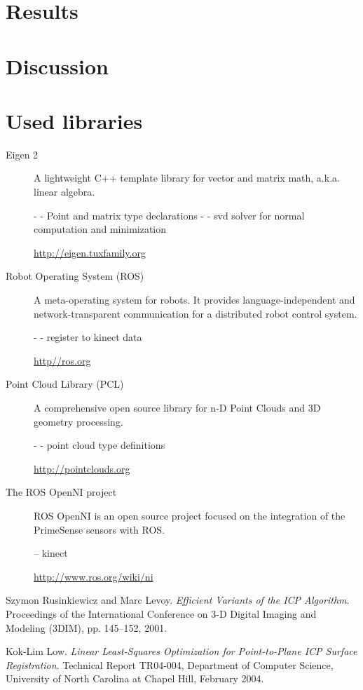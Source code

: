 \documentclass[twocolumn]{article}
\begin{document}
\section{Results}

\section{Discussion}

\section{Used libraries}
\begin{description}
\item[Eigen 2]
A lightweight C++ template library for vector and matrix math,
a.k.a. linear algebra.

- - Point and matrix type declarations
- - svd solver for normal computation and minimization

\href{http://eigen.tuxfamily.org}{http://eigen.tuxfamily.org}

\item[Robot Operating System (ROS)]
A meta-operating system for robots. It provides
language-independent and network-transparent communication for a
distributed robot control system.

- - register to kinect data

\href{http://ros.org}{http//ros.org}

\item[Point Cloud Library (PCL)]
A comprehensive open source library for n-D Point Clouds and 3D geometry processing.

- - point cloud type definitions

\href{http://pointclouds.org}{http://pointclouds.org}

\item[The ROS OpenNI project]
ROS OpenNI is an open source project focused on the integration of the PrimeSense sensors with ROS.

-- kinect

\href{http://www.ros.org/wiki/ni}{http://www.ros.org/wiki/ni}

\end{description}

\begin{thebibliography}{99}
Szymon Rusinkiewicz and Marc Levoy.
\emph{Efficient Variants of the ICP Algorithm}.
Proceedings of the International Conference on 3-D Digital Imaging and
Modeling (3DIM), pp. 145–152, 2001.

Kok-Lim Low.
\emph{Linear Least-Squares Optimization for
Point-to-Plane ICP Surface Registration}.
Technical Report TR04-004, Department of Computer Science, University of North Carolina at Chapel Hill, February 2004.

\end{thebibliography}
\end{document}
